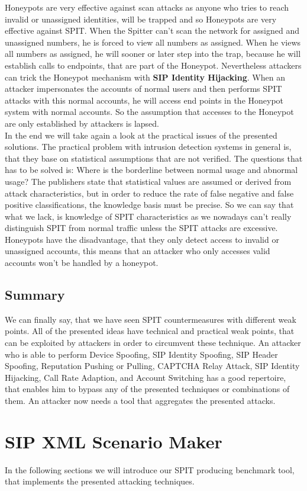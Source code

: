 \documentclass[final
	]{issa}
\begin{document}
Honeypots are very effective against scan attacks as anyone who tries to reach invalid or unassigned identities, will be trapped and so Honeypots are very effective against SPIT. When the Spitter can't scan the network for assigned and unassigned numbers, he is forced to view all numbers as assigned. When he views all numbers as assigned, he will sooner or later step into the trap, because he will establish calls to endpoints, that are part of the Honeypot. Nevertheless attackers can trick the Honeypot mechanism with \textbf{SIP Identity Hijacking}. When an attacker impersonates the accounts of normal users and then performs SPIT attacks with this normal accounts, he will access end points in the Honeypot system with normal accounts. So the assumption that accesses to the Honeypot are only established by attackers is lapsed.\\
In the end we will take again a look at the practical issues of the presented solutions. The practical problem with intrusion detection systems in general is, that they base on statistical assumptions that are not verified. The questions that has to be solved is: Where is the borderline between normal usage and abnormal usage? The publishers state that statistical values are assumed or derived from attack characteristics, but in order to reduce the rate of false negative and false positive classifications, the knowledge basis must be precise. So we can say that what we lack, is knowledge of SPIT characteristics as we nowadays can't really distinguish SPIT from normal traffic unless the SPIT attacks are excessive.
Honeypots have the disadvantage, that they only detect access to invalid or unassigned accounts, this means that an attacker who only accesses valid accounts won't be handled by a honeypot. 
\subsection{Summary}
We can finally say, that we have seen SPIT countermeasures with different weak points. All of the presented ideas have technical and practical weak points, that can be exploited by attackers in order to circumvent these technique. An attacker who is able to perform 
Device Spoofing, SIP Identity Spoofing, SIP Header Spoofing, Reputation Pushing or Pulling,
CAPTCHA Relay Attack, SIP Identity Hijacking, Call Rate Adaption, and Account Switching
has a good repertoire, that enables him to bypass any of the presented techniques or combinations of them. An attacker now needs a tool that aggregates the presented attacks.
\section{SIP XML Scenario Maker}
In the following sections we will introduce our SPIT producing benchmark tool, that implements the presented attacking techniques.
\end{document}
